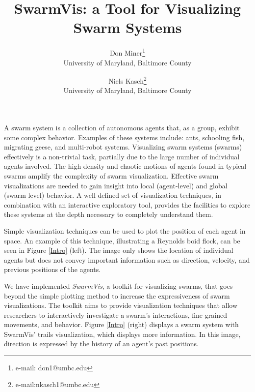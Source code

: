 \documentclass{vgtc}
\title{SwarmVis: a Tool for Visualizing Swarm Systems}
\author{Don Miner\thanks{e-mail: don1@umbc.edu}\\ %
        \scriptsize University of Maryland, Baltimore County %
\and Niels Kasch\thanks{e-mail:nkasch1@umbc.edu}\\ %
     \scriptsize University of Maryland, Baltimore County %
}
\begin{document}

\maketitle

A swarm system is a collection of autonomous agents that, as a group, exhibit some complex behavior.
Examples of these systems include: ants\cite{couzin2003sol}, schooling fish\cite{parrish2002sof}, migrating geese\cite{reynolds1987}, 
and multi-robot systems\cite{mondada2004sbn}\cite{mclurkin2004srt}.
Visualizing swarm systems (swarms) effectively is a non-trivial task, partially due to the large number of individual agents involved.
The high density and chaotic motions of agents found in typical swarms amplify the complexity of swarm visualization.
Effective swarm visualizations are needed to gain insight into local (agent-level) and global (swarm-level) behavior.
A well-defined set of visualization techniques, in combination with an interactive exploratory tool,
provides the facilities to explore these systems at the depth necessary to completely understand them.


Simple visualization techniques can be used to plot the position of each agent in space.
An example of this technique, illustrating a Reynolds boid flock\cite{reynolds1987}, can be seen in Figure \ref{Intro} (left).
The image only shows the location of individual agents but does not convey important
information such as direction, velocity, and previous positions of the agents.

We have implemented \textit{SwarmVis}, a toolkit for visualizing swarms,
that goes beyond the simple plotting method to increase the
expressiveness of swarm visualizations.
The toolkit aims to provide visualization techniques that allow researchers to interactively
investigate a swarm's interactions, fine-grained movements, and behavior.
Figure \ref{Intro} (right) displays a swarm system with SwarmVis' trails visualization, which displays more information.
In this image, direction is expressed by the history of an agent's past positions.
\end{document}
